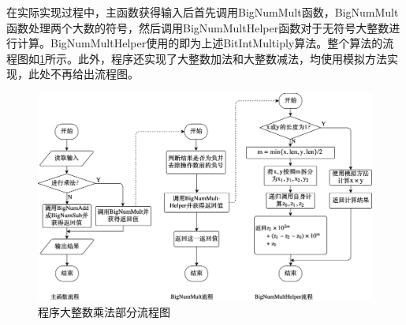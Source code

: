 \documentclass{report}
\begin{document}
在实际实现过程中，主函数获得输入后首先调用BigNumMult函数，BigNumMult函数处理两个大数的符号，然后调用BigNumMultHelper函数对于无符号大整数进行计算。BigNumMultHelper使用的即为上述BitIntMultiply算法。整个算法的流程图如\ref{fig:flowchart2}所示。此外，程序还实现了大整数加法和大整数减法，均使用模拟方法实现，此处不再给出流程图。

\begin{figure}[H]
    \centering
    \includegraphics[width=0.9\linewidth]{flowchart2.png}
    \caption{程序大整数乘法部分流程图}
    \label{fig:flowchart2}
\end{figure}
\end{document}

